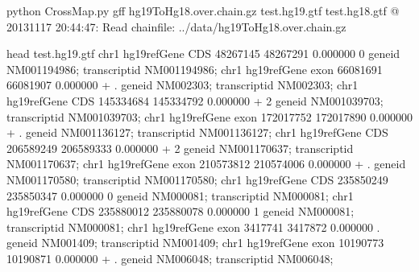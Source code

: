 \documentclass[letterpaper,10pt,english]{sphinxmanual}
\begin{document}
\begin{sphinxVerbatim}[commandchars=\\\{\}]
\PYGZdl{} python CrossMap.py gff  hg19ToHg18.over.chain.gz test.hg19.gtf test.hg18.gtf
@ 2013\PYGZhy{}11\PYGZhy{}17 20:44:47: Read chain\PYGZus{}file:  ../data/hg19ToHg18.over.chain.gz

\PYGZdl{} head test.hg19.gtf
chr1   hg19\PYGZus{}refGene    CDS     48267145        48267291        0.000000        \PYGZhy{}       0       gene\PYGZus{}id \PYGZdq{}NM\PYGZus{}001194986\PYGZdq{}; transcript\PYGZus{}id \PYGZdq{}NM\PYGZus{}001194986\PYGZdq{};
chr1   hg19\PYGZus{}refGene    exon    66081691        66081907        0.000000        +       .       gene\PYGZus{}id \PYGZdq{}NM\PYGZus{}002303\PYGZdq{}; transcript\PYGZus{}id \PYGZdq{}NM\PYGZus{}002303\PYGZdq{};
chr1   hg19\PYGZus{}refGene    CDS     145334684       145334792       0.000000        +       2       gene\PYGZus{}id \PYGZdq{}NM\PYGZus{}001039703\PYGZdq{}; transcript\PYGZus{}id \PYGZdq{}NM\PYGZus{}001039703\PYGZdq{};
chr1   hg19\PYGZus{}refGene    exon    172017752       172017890       0.000000        +       .       gene\PYGZus{}id \PYGZdq{}NM\PYGZus{}001136127\PYGZdq{}; transcript\PYGZus{}id \PYGZdq{}NM\PYGZus{}001136127\PYGZdq{};
chr1   hg19\PYGZus{}refGene    CDS     206589249       206589333       0.000000        +       2       gene\PYGZus{}id \PYGZdq{}NM\PYGZus{}001170637\PYGZdq{}; transcript\PYGZus{}id \PYGZdq{}NM\PYGZus{}001170637\PYGZdq{};
chr1   hg19\PYGZus{}refGene    exon    210573812       210574006       0.000000        +       .       gene\PYGZus{}id \PYGZdq{}NM\PYGZus{}001170580\PYGZdq{}; transcript\PYGZus{}id \PYGZdq{}NM\PYGZus{}001170580\PYGZdq{};
chr1   hg19\PYGZus{}refGene    CDS     235850249       235850347       0.000000        \PYGZhy{}       0       gene\PYGZus{}id \PYGZdq{}NM\PYGZus{}000081\PYGZdq{}; transcript\PYGZus{}id \PYGZdq{}NM\PYGZus{}000081\PYGZdq{};
chr1   hg19\PYGZus{}refGene    CDS     235880012       235880078       0.000000        \PYGZhy{}       1       gene\PYGZus{}id \PYGZdq{}NM\PYGZus{}000081\PYGZdq{}; transcript\PYGZus{}id \PYGZdq{}NM\PYGZus{}000081\PYGZdq{};
chr1   hg19\PYGZus{}refGene    exon    3417741 3417872 0.000000        \PYGZhy{}       .       gene\PYGZus{}id \PYGZdq{}NM\PYGZus{}001409\PYGZdq{}; transcript\PYGZus{}id \PYGZdq{}NM\PYGZus{}001409\PYGZdq{};
chr1   hg19\PYGZus{}refGene    exon    10190773        10190871        0.000000        +       .       gene\PYGZus{}id \PYGZdq{}NM\PYGZus{}006048\PYGZdq{}; transcript\PYGZus{}id \PYGZdq{}NM\PYGZus{}006048\PYGZdq{};


\end{sphinxVerbatim}
\end{document}
